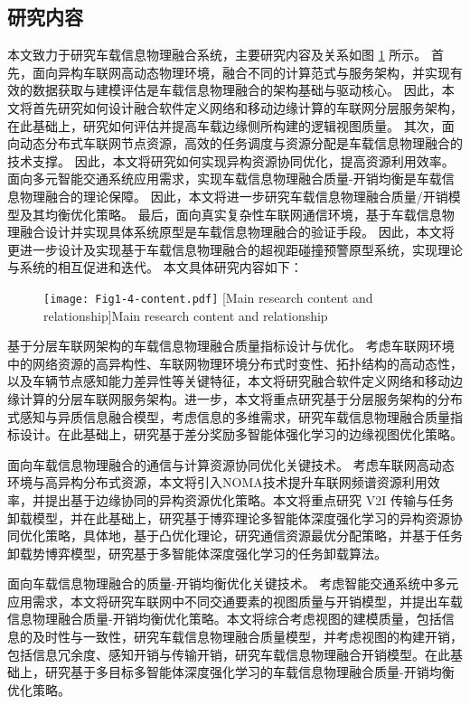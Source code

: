 \subsection{研究内容}

本文致力于研究车载信息物理融合系统，主要研究内容及关系如图 \ref{fig 1-4} 所示。
首先，面向异构车联网高动态物理环境，融合不同的计算范式与服务架构，并实现有效的数据获取与建模评估是车载信息物理融合的架构基础与驱动核心。
因此，本文将首先研究如何设计融合软件定义网络和移动边缘计算的车联网分层服务架构，在此基础上，研究如何评估并提高车载边缘侧所构建的逻辑视图质量。
其次，面向动态分布式车联网节点资源，高效的任务调度与资源分配是车载信息物理融合的技术支撑。
因此，本文将研究如何实现异构资源协同优化，提高资源利用效率。
面向多元智能交通系统应用需求，实现车载信息物理融合质量-开销均衡是车载信息物理融合的理论保障。
因此，本文将进一步研究车载信息物理融合质量/开销模型及其均衡优化策略。
最后，面向真实复杂性车联网通信环境，基于车载信息物理融合设计并实现具体系统原型是车载信息物理融合的验证手段。
因此，本文将更进一步设计及实现基于车载信息物理融合的超视距碰撞预警原型系统，实现理论与系统的相互促进和迭代。
本文具体研究内容如下：

\begin{figure}[h] 
	\centering
	\texttt{[image: Fig1-4-content.pdf]}
	[Main research content and relationship]{Main research content and relationship}
	\label{fig 1-4}
\end{figure}

 基于分层车联网架构的车载信息物理融合质量指标设计与优化。
考虑车联网环境中的网络资源的高异构性、车联网物理环境分布式时变性、拓扑结构的高动态性，以及车辆节点感知能力差异性等关键特征，本文将研究融合软件定义网络和移动边缘计算的分层车联网服务架构。进一步，本文将重点研究基于分层服务架构的分布式感知与异质信息融合模型，考虑信息的多维需求，研究车载信息物理融合质量指标设计。在此基础上，研究基于差分奖励多智能体强化学习的边缘视图优化策略。

 面向车载信息物理融合的通信与计算资源协同优化关键技术。
考虑车联网高动态环境与高异构分布式资源，本文将引入NOMA技术提升车联网频谱资源利用效率，并提出基于边缘协同的异构资源优化策略。本文将重点研究 V2I 传输与任务卸载模型，并在此基础上，研究基于博弈理论多智能体深度强化学习的异构资源协同优化策略，具体地，基于凸优化理论，研究通信资源最优分配策略，并基于任务卸载势博弈模型，研究基于多智能体深度强化学习的任务卸载算法。

 面向车载信息物理融合的质量-开销均衡优化关键技术。
考虑智能交通系统中多元应用需求，本文将研究车联网中不同交通要素的视图质量与开销模型，并提出车载信息物理融合质量-开销均衡优化策略。本文将综合考虑视图的建模质量，包括信息的及时性与一致性，研究车载信息物理融合质量模型，并考虑视图的构建开销，包括信息冗余度、感知开销与传输开销，研究车载信息物理融合开销模型。在此基础上，研究基于多目标多智能体深度强化学习的车载信息物理融合质量-开销均衡优化策略。

